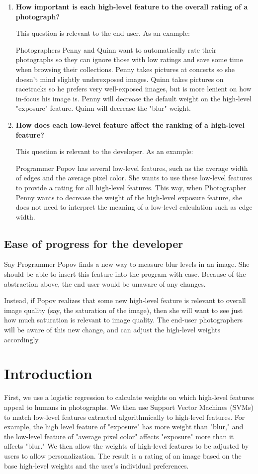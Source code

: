 \documentclass[10pt,twocolumn]{article}
\begin{document}
\begin{enumerate}
\item \textbf{How important is each high-level feature to the overall rating of a photograph?}

This question is relevant to the end user. As an example:

Photographers Penny and Quinn want to automatically rate their photographs so they can ignore those with low ratings and save some time when browsing their collections. Penny takes pictures at concerts so she doesn't mind slightly underexposed images. Quinn takes pictures on racetracks so he prefers very well-exposed images, but is more lenient on how in-focus his image is. Penny will decrease the default weight on the high-level "exposure" feature. Quinn will decrease the "blur" weight.

\item \textbf{How does each low-level feature affect the ranking of a high-level feature?}

This  question is relevant to the developer. As an example:

Programmer Popov has several low-level features, such as the average width of edges and the average pixel color. She wants to use these low-level features to provide a rating for all high-level features. This way, when Photographer Penny wants to decrease the weight of the high-level exposure feature, she does not need to interpret the meaning of a low-level calculation such as edge width.
\end{enumerate}

\subsection{Ease of progress for the developer}
Say Programmer Popov finds a new way to measure blur levels in an image. She should be able to insert this feature into the program with ease. Because of the abstraction above, the end user would be unaware of any changes.

Instead, if Popov realizes that some new high-level feature is relevant to overall image quality (say, the saturation of the image), then she will want to see just how much saturation is relevant to image quality. The end-user photographers will be aware of this new change, and can adjust the high-level weights accordingly.

\section{Introduction}
First, we use a logistic regression to calculate weights on which high-level features appeal to humans in photographs. We then use Support Vector Machines (SVMs) to match low-level features extracted algorithmically to high-level features. For example, the high level feature of "exposure" has more weight than "blur," and the low-level feature of "average pixel color" affects "exposure" more than it affects "blur." We then allow the weights of high-level features to be adjusted by users to allow personalization. The result is a rating of an image based on the base high-level weights and the user's individual preferences.
\end{document}
